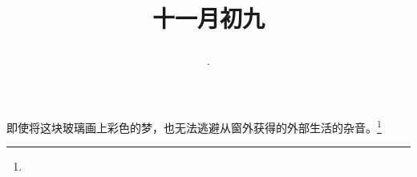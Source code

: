 \title{\date[d=9,m=12,y=2024][year:cn-y,年,month:cn,day:cn,日,·,weekday]·十一月初九 }
即使将这块玻璃画上彩色的梦，也无法逃避从窗外获得的外部生活的杂音。\footnote{ }

